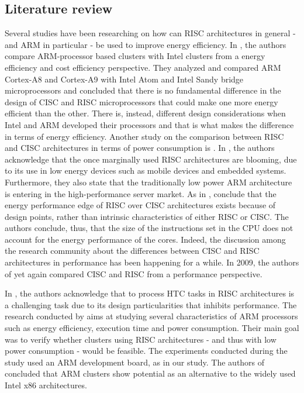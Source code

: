 \subsection*{Literature review}

Several studies have been researching on how can RISC architectures in general - and ARM in particular - be used to improve energy efficiency. In \cite{CISC_RISC}, the authors compare ARM-processor based clusters with Intel clusters from a energy efficiency and cost efficiency perspective. They analyzed and compared ARM Cortex-A8 and Cortex-A9 with Intel Atom and Intel Sandy bridge microprocessors and concluded that there is no fundamental difference in the design of CISC and RISC microprocessors that could make one more energy efficient than the other. There is, instead, different design considerations when Intel and ARM developed their processors and that is what makes the difference in terms of energy efficiency. Another study on the comparison between RISC and CISC architectures in terms of power consumption is \cite{CISC_RISC_2}. In \cite{CISC_RISC_2}, the authors acknowledge that the once marginally used RISC architectures are blooming, due to its use in low energy devices such as mobile devices and embedded systems. Furthermore, they also state that the traditionally low power ARM architecture is entering in the high-performance server market. As in \cite{CISC_RISC}, \cite{CISC_RISC_2} conclude that the energy performance edge of RISC over CISC architectures exists because of design points, rather than intrinsic characteristics of either RISC or CISC. The authors conclude, thus, that the size of the instructions set in the CPU does not account for the energy performance of the cores. Indeed, the discussion among the research community about the differences between CISC and RISC architectures in performance has been happening for a while. In 2009, the authors of \cite{CR_TALE} yet again compared CISC and RISC from a performance perspective.  

In \cite{RISC_PERF}, the authors acknowledge that to process HTC tasks in RISC architectures is a challenging task due to its design particularities that inhibits performance. The research conducted by \cite{EVAL_ARM} aims at studying several characteristics of ARM processors such as energy efficiency, execution time and power consumption. Their main goal was to verify whether clusters using RISC architectures - and thus with low power consumption - would be feasible. The experiments conducted during the study used an ARM development board, as in our study. The authors of \cite{EVAL_ARM} concluded that ARM clusters show potential as an alternative to the widely used Intel x86 architectures.

